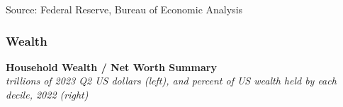 \documentclass{report}
\newcommand{\tbllink}[1]{\href{https://raw.githubusercontent.com/bdecon/US-chartbook/master/chartbook/data/#1}{\faTable}}
\begin{document}
{\begin{minipage}{0.76\textwidth}
\footnotesize{Source: Federal Reserve, Bureau of Economic Analysis} \hfill \tbllink{dpish.csv}
\end{minipage}
\newpage
\vspace{-10mm}

\begin{minipage}{0.76\textwidth}   
\subsubsection*{Wealth}
\small  
\vspace{1mm}

\normalsize \textbf{Household Wealth / Net Worth Summary}\\
\footnotesize{\textit{trillions of 2023 Q2 US dollars (left), and percent of US wealth held by each decile, 2022 (right)}}
\end{minipage}
\vspace*{-2mm}

}
\end{document}
